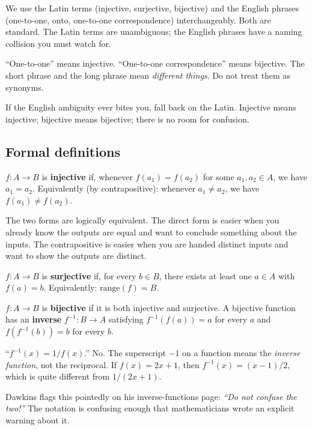 We use the Latin terms (injective, surjective, bijective) and the English phrases (one-to-one, onto, one-to-one correspondence) interchangeably. Both are standard. The Latin terms are unambiguous; the English phrases have a naming collision you must watch for.

\begin{mistake}
``One-to-one'' means injective. ``One-to-one correspondence'' means bijective. The short phrase and the long phrase mean \emph{different things}. Do not treat them as synonyms.

If the English ambiguity ever bites you, fall back on the Latin. Injective means injective; bijective means bijective; there is no room for confusion.
\end{mistake}

\subsection*{Formal definitions}

\begin{definition}[injective]
$f : A \to B$ is \textbf{injective} if, whenever $f(a_1) = f(a_2)$ for some $a_1, a_2 \in A$, we have $a_1 = a_2$. Equivalently (by contrapositive): whenever $a_1 \neq a_2$, we have $f(a_1) \neq f(a_2)$.
\end{definition}

The two forms are logically equivalent. The direct form is easier when you already know the outputs are equal and want to conclude something about the inputs. The contrapositive is easier when you are handed distinct inputs and want to show the outputs are distinct.

\begin{definition}[surjective]
$f : A \to B$ is \textbf{surjective} if, for every $b \in B$, there exists at least one $a \in A$ with $f(a) = b$. Equivalently: $\mathrm{range}(f) = B$.
\end{definition}

\begin{definition}[bijective]
$f : A \to B$ is \textbf{bijective} if it is both injective and surjective. A bijective function has an \textbf{inverse} $f^{-1} : B \to A$ satisfying $f^{-1}(f(a)) = a$ for every $a$ and $f(f^{-1}(b)) = b$ for every $b$.
\end{definition}

\begin{mistake}
``$f^{-1}(x) = 1/f(x)$.'' No. The superscript $-1$ on a function means the \emph{inverse function}, not the reciprocal. If $f(x) = 2x + 1$, then $f^{-1}(x) = (x - 1)/2$, which is quite different from $1/(2x + 1)$.

Dawkins flags this pointedly on his inverse-functions page: \textit{``Do not confuse the two!''} The notation is confusing enough that mathematicians wrote an explicit warning about it.
\end{mistake}

